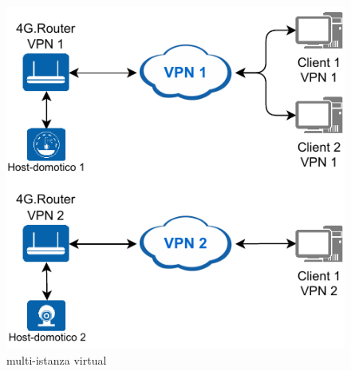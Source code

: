 \begin{figure}
    \centering
    \includegraphics[width=0.6\linewidth]{immagini/diag2-multiistanza_virtual}
    \caption{multi-istanza virtual}
    \label{fig:diag2-multiistanza_virtual}
\end{figure}

